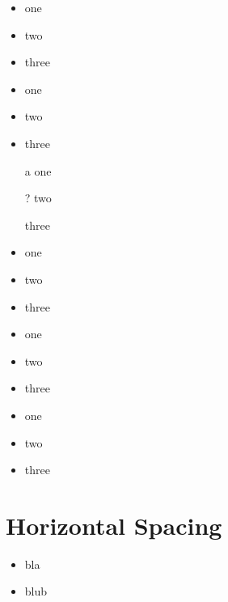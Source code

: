 \documentclass{article}
\begin{document}
\begin{itemize}
	\item one
	\item two
	\item three
\end{itemize}
\begin{itemize}[label=\textcolor{blue}{$\blacktriangle$}]
	\item one
	\item two
	\item three
\end{itemize}
\begin{itemize}
	\item[a] one
	\item[?] two
	\item[] three
\end{itemize}
\begin{itemize}
	\huge
	\item one
	\LARGE
	\item two
	\tiny
	\item three
\end{itemize}
\begin{itemize}[label=\raisebox{0.25ex}{\tiny$\bullet$}]
	\item one
	\item two
	\item three
\end{itemize}
\begin{itemize}
	\fontsize{30}{1cm}\selectfont
	\item one
	\item two
	\item three
\end{itemize}
\section*{Horizontal Spacing}
\begin{itemize}[labelsep=5.5]
	\item bla
	\item blub
\end{itemize}
\end{document}
